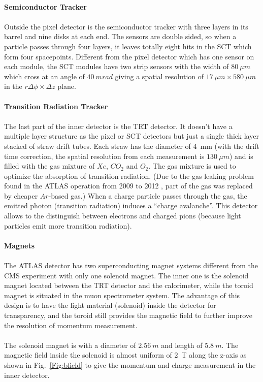 \\{\bf Semiconductor Tracker}
\\
\\Outside the pixel detector is the semiconductor tracker with three layers in its barrel and nine disks at each end. The sensors are double sided, so when a particle passes through four layers, it leaves totally eight hits in the SCT which form four spacepoints. Different from the pixel detector which has one sensor on each module, the SCT modules have two strip sensors with the width of $80~\mu m$ which cross at  an angle of $40~mrad$ giving a spatial resolution of $17~\mu m \times 580~\mu m$ in the $r\Delta \phi \times \Delta z$ plane. 
\\
\\{\bf Transition Radiation Tracker}
\\
\\The last part of the inner detector is the TRT detector. It doesn't have a multiple layer structure as the pixel or SCT detectors but just a single thick layer stacked of straw drift tubes. Each straw has the diameter of 4~mm (with the drift time correction, the spatial resolution from each measurement is $130~\mu m$) and is filled with the gas mixture of $Xe$, $CO_{2}$ and $O_{2}$. The gas mixture is used to optimize the absorption of transition radiation. (Due to the gas leaking problem found in the ATLAS operation from 2009 to 2012 \cite{Mindur:2139567}, part of the gas was replaced by cheaper $Ar$-based gas.) When a charge particle passes through the gas, the emitted photon (transition radiation) induces a ``charge avalanche''. This detector allows to the distinguish between electrons and charged pions (because light particles emit more transition radiation).
\\
\\{\bf Magnets}
\\
\\ The ATLAS detector has two superconducting magnet systems different from the CMS experiment with only one solenoid magnet. The inner one is the solenoid magnet located between the TRT detector and the calorimeter, while the toroid magnet is situated in the muon spectrometer system. The advantage of this design is to have the light material (solenoid) inside the detector for transparency, and the toroid still provides the magnetic field to further improve the resolution of momentum measurement\cite{magnets}.  
\\
\\The solenoid magnet is with a diameter of $2.56~m$ and length of $5.8~m$.  The magnetic field inside the solenoid is almost uniform of 2~T along the z-axis as shown in Fig.~\ref{Fig:bfield} to give the momentum and charge measurement in the inner detector. 
